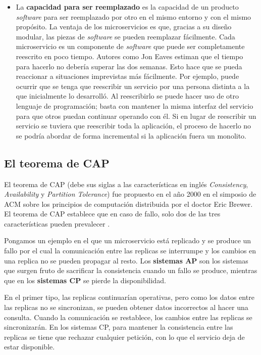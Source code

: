 \documentclass[11pt,spanish,listoffigures]{tfgetsinf}
\begin{document}
\begin{itemize}
\item La \textbf{capacidad para ser reemplazado} es la capacidad de un producto \textit{software} para ser reemplazado por otro en el mismo entorno y con el mismo propósito. La ventaja de los microservicios es que, gracias a su diseño modular, las piezas de \textit{software} se pueden reemplazar fácilmente. Cada microservicio es un componente de \textit{software} que puede ser completamente reescrito en poco tiempo. Autores como Jon Eaves \cite{Eaves2014} estiman que el tiempo para hacerlo no debería superar las dos semanas. Esto hace que se pueda reaccionar a situaciones imprevistas más fácilmente. Por ejemplo, puede ocurrir que se tenga que reescribir un servicio por una persona distinta a la que inicialmente lo desarrolló. Al reescribirlo se puede hacer uso de otro lenguaje de programación; basta con mantener la misma interfaz del servicio para que otros puedan continuar operando con él. Si en lugar de reescribir un servicio se tuviera que reescribir toda la aplicación, el proceso de hacerlo no se podría abordar de forma incremental si la aplicación fuera un monolito.

\end{itemize}

\subsection{El teorema de CAP}

El teorema de CAP \cite{Brewer2000} (debe sus siglas a las características en inglés \textit{Consistency}, \textit{Availability} y \textit{Partition Tolerance}) fue propuesto en el año 2000 en el simposio de ACM sobre los principios de computación distribuida por el doctor Eric Brewer. El teorema de CAP establece que en caso de fallo, solo dos de las tres características pueden prevalecer \cite{Gilbert2012}.

Pongamos un ejemplo en el que un microservicio está replicado y se produce un fallo por el cual la comunicación entre las replicas se interrumpe y los cambios en una replica no se pueden propagar al resto. Los \textbf{sistemas AP} son los sistemas que surgen fruto de sacrificar la consistencia cuando un fallo se produce, mientras que en los \textbf{sistemas CP} se pierde la disponibilidad. 

En el primer tipo, las replicas continuarían operativas, pero como los datos entre las replicas no se sincronizan, se pueden obtener datos incorrectos al hacer una consulta. Cuando la comunicación se restablece, los cambios entre las replicas se sincronizarán. En los sistemas CP, para mantener la consistencia entre las replicas se tiene que rechazar cualquier petición, con lo que el servicio deja de estar disponible.
\end{document}
